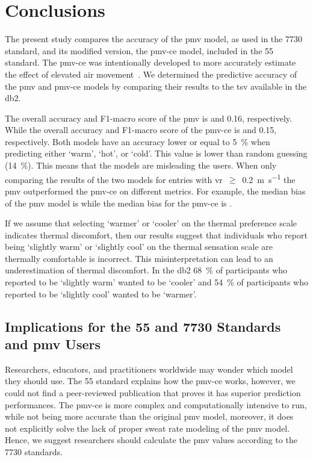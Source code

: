 \section{Conclusions}\label{sec:conclusions}
The present study compares the accuracy of the \ac{pmv} model, as used in the \gls{7730} standard, and its modified version, the \ac{pmv-ce} model, included in the \gls{55} standard.
The \ac{pmv-ce} was intentionally developed to more accurately estimate the effect of elevated air movement~\cite{arens_moving_2009}.
We determined the predictive accuracy of the \ac{pmv} and \ac{pmv-ce} models by comparing their results to the \ac{tsv} available in the \acl{db2}.

The overall accuracy and F1-macro score of the \ac{pmv} is  and \num{.16}, respectively.
While the overall accuracy and F1-macro score of the \ac{pmv-ce} is  and \num{.15}, respectively.
Both models have an accuracy lower or equal to \qty{5}{\percent} when predicting either `warm', `hot', or `cold'.
This value is lower than random guessing (\qty{14}{\percent}).
This means that the models are misleading the users.
When only comparing the results of the two models for entries with \ac{vr}~$\geq$~\qty{0.2}{\m\per\s} the \ac{pmv} outperformed the \ac{pmv-ce} on different metrics.
For example, the median bias of the \ac{pmv} model is  while the median bias for the \ac{pmv-ce} is .

If we assume that selecting `warmer' or `cooler' on the thermal preference scale indicates thermal discomfort, then our results suggest that individuals who report being `slightly warm' or `slightly cool’ on the thermal sensation scale are thermally comfortable is incorrect. 
This misinterpretation can lead to an underestimation of thermal discomfort. 
In the \ac{db2} \qty{68}{\percent} of participants who reported to be `slightly warm' wanted to be `cooler' and \qty{54}{\percent} of participants who reported to be `slightly cool' wanted to be `warmer'.

\subsection{Implications for the \gls{55} and \gls{7730} Standards and \ac{pmv} Users}\label{subsec:implications-for-the-ashrae-55-and-iso-7730-standards}
Researchers, educators, and practitioners worldwide may wonder which model they should use.
The \gls{55} standard explains how the \ac{pmv-ce} works, however, we could not find a peer-reviewed publication that proves it has superior prediction performances.
The \ac{pmv-ce} is more complex and computationally intensive to run, while not being more accurate than the original \ac{pmv} model, moreover, it does not explicitly solve the lack of proper sweat rate modeling of the \ac{pmv} model. 
Hence, we suggest researchers should calculate the \ac{pmv} values according to the \gls{7730} standards.

